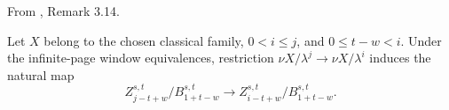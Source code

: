\begin{theorem}
\label{frontier:Literature:636e4c89b3e4}
From \cite{LWX126}, Remark 3.14.\par

Let $X$ belong to the chosen classical family, $0<i\le j$, and $0\le t-w<i$. Under the infinite-page window equivalences, restriction $\nu X/\lambda^j\to\nu X/\lambda^i$ induces the natural map\[Z_{j-t+w}^{s,t}/B_{1+t-w}^{s,t}\longrightarrow Z_{i-t+w}^{s,t}/B_{1+t-w}^{s,t}.\]
\end{theorem}

